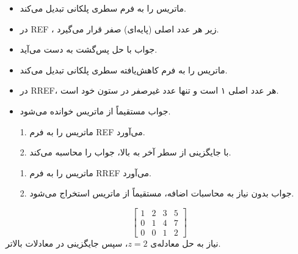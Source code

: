 \begin{nokteh}
	\begin{itemize}
		\item 
		ماتریس را به فرم سطری پلکانی
		تبدیل می‌کند.  
		\item 
		در REF
		، زیر هر عدد اصلی (پایه‌ای) صفر قرار می‌گیرد.  
		\item 
		جواب با حل پس‌گشت
		به دست می‌آید.
		
	\end{itemize}
\end{nokteh}
\begin{nokteh}
	


 \begin{itemize}
 	\item 
 	ماتریس را به فرم کاهش‌یافته سطری پلکانی
 	 تبدیل می‌کند.
 	\item 
 	در RREF، هر عدد اصلی ۱ است و تنها عدد غیرصفر در ستون خود است.
 	\item 
 	جواب مستقیماً از ماتریس خوانده می‌شود.
 	
 \end{itemize}
 
\end{nokteh}

\begin{nokteh}
	
\begin{itemize}
	\item [1. ]
	ماتریس را به فرم REF می‌آورد.
	\item [2. ]
	با جایگزینی از سطر آخر به بالا، جواب را محاسبه می‌کند.

\end{itemize}	
\end{nokteh}
\begin{nokteh}
	
	\begin{itemize}
		\item [1. ]
		ماتریس را به فرم RREF می‌آورد. 
		\item [2. ]
		جواب بدون نیاز به محاسبات اضافه، مستقیماً از ماتریس استخراج می‌شود.
		
	\end{itemize}	
\end{nokteh}

\begin{nokteh}
	\[
	\begin{bmatrix}
		1 & 2 & 3 & 5 \\
		0 & 1 & 4 & 7 \\
		0 & 0 & 1 & 2
	\end{bmatrix}
	\]
	نیاز به حل معادله‌ی \( z = 2 \)، سپس جایگزینی در معادلات بالاتر.
\end{nokteh}


